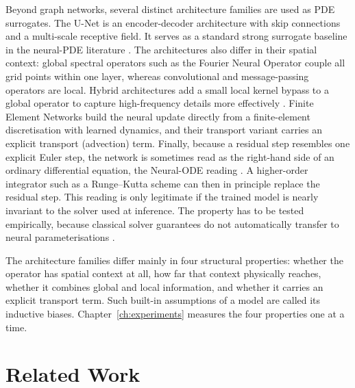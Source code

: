 Beyond graph networks, several distinct architecture families are used
as PDE surrogates.
The U-Net \citep{Ronneberger2015} is an encoder-decoder
architecture with skip connections and a multi-scale receptive field.
It serves as a standard strong surrogate baseline in the neural-PDE
literature \citep{Gupta2023}.
The architectures also differ in their spatial context: global
spectral operators such as the Fourier Neural Operator couple all grid
points within one layer, whereas convolutional and message-passing
operators are local. Hybrid architectures add a small local kernel
bypass to a global operator
to capture high-frequency details more effectively
\citep{LiuSchiaffini2024}.
Finite Element Networks \citep{Lienen2022} build the neural update
directly from a finite-element discretisation with learned dynamics, and
their transport variant carries an explicit transport (advection) term.
Finally, because a residual step resembles one explicit Euler step, the
network is sometimes read as the right-hand side of an ordinary
differential equation, the Neural-ODE reading \citep{Chen2018}. A
higher-order integrator such as a Runge--Kutta scheme can then in
principle replace the residual step. This reading is only legitimate if
the trained model is nearly invariant to the solver used at inference.
The property has to be tested empirically, because classical solver
guarantees do not automatically transfer to neural parameterisations
\citep{Ott2021, Krishnapriyan2023}.

The architecture families differ mainly in four structural properties:
whether the operator has spatial context at all, how far that context
physically reaches, whether it combines global and local information,
and whether it carries an explicit transport term. Such built-in
assumptions of a model are called its inductive biases.
Chapter~\ref{ch:experiments} measures the four properties one at a time.


\section{Related Work}
\label{sec:background:related-work}

